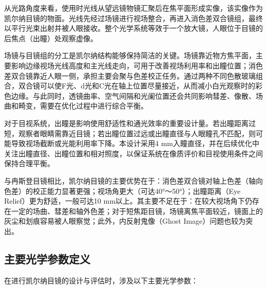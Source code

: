 从光路角度来看，使用时光线从望远镜物镜汇聚后在焦平面形成实像，该实像作为凯尔纳目镜的物面。光线先经过场镜进行视场整合，再进入消色差双合镜组，最终以平行光束出射并被人眼接收。整个光学系统等效于一个放大镜，人眼位于目镜的后焦点（出瞳）处观察虚像。

场镜与目镜组的分工是凯尔纳结构能够保持简洁的关键。场镜靠近物方焦平面，主要影响边缘视场光线高度和主光线走向，可用于改善视场利用率和出瞳位置；消色差双合镜靠近人眼一侧，承担主要会聚与色差校正任务。通过两种不同色散玻璃组合，双合镜可以使F光、d光和C光在轴上位置尽量接近，从而减小白光观察时的彩色边缘。与此同时，透镜曲率、空气间隔和光阑位置还会共同影响彗差、像散、场曲和畸变，需要在优化过程中进行综合平衡。

对于目视系统，出瞳是影响使用舒适性和通光效率的重要设计量。若出瞳距离过短，观察者眼睛需靠近目镜；若出瞳位置过远或出瞳直径与人眼瞳孔不匹配，则可能导致视场截断或光能利用率下降。本设计采用4 mm入瞳直径，并在后续优化中关注出瞳直径、出瞳位置和相对照度，以保证系统在像质评价和目视使用条件之间保持合理平衡。

与冉斯登目镜相比，凯尔纳目镜的主要优势在于：消色差双合镜对轴上色差（轴向色差）的校正能力显著更强；视场角更大（可达40°～50°）；出瞳距离（Eye Relief）更为舒适，一般可达10 mm以上。其主要不足在于：在较大视场角下仍存在一定的场曲、彗差和轴外色差；对于短焦距目镜，场镜离焦平面较近，镜面上的灰尘和划痕容易被人眼察觉；此外，内反射鬼像（Ghost Image）问题也较为突出。

\subsection{主要光学参数定义}

在进行凯尔纳目镜的设计与评估时，涉及以下主要光学参数\cite{Yu2016,Mu2000,Hecht2017}：

